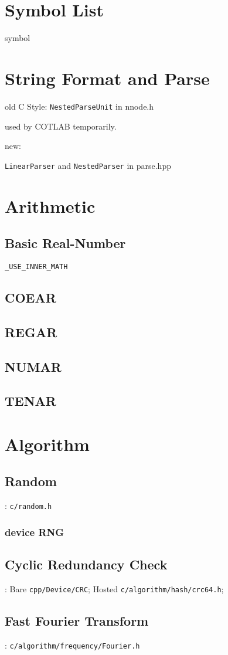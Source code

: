 
\section{Symbol List}
{symbol}

\section{String Format and Parse}

old C Style: \verb`NestedParseUnit` in nnode.h

used by COTLAB temporarily.

new:

\verb`LinearParser` and \verb`NestedParser` in parse.hpp


\section{Arithmetic}

\subsection{Basic Real-Number}

\verb|_USE_INNER_MATH|

\subsection{COEAR}

\subsection{REGAR}

\subsection{NUMAR}

\subsection{TENAR}

\section{Algorithm}

\subsection{Random}
: \verb`c/random.h`

\subsubsection{device RNG}

\subsection{Cyclic Redundancy Check}

:
Bare \verb`cpp/Device/CRC`;
Hosted \verb`c/algorithm/hash/crc64.h`;

\subsection{Fast Fourier Transform}

: \verb`c/algorithm/frequency/Fourier.h`

